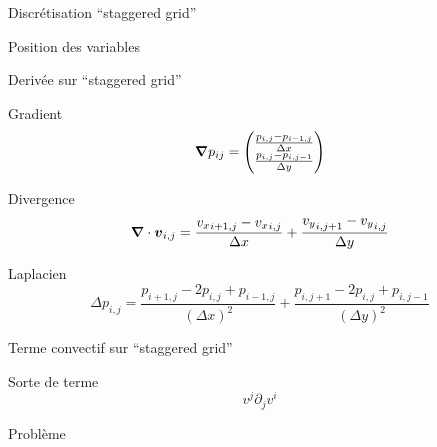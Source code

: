 \begin{frame}{Discrétisation ``staggered grid''}
\begin{block}{Position des variables}
\shorthandoff{;:} 
 \shorthandon{:;}
\end{block}

 
\end{frame}

\begin{frame}{Derivée sur ``staggered grid''}
\begin{block}{Gradient}
 \begin{equation*}
  {\boldsymbol {\nabla}}p_{ij}=\begin{pmatrix}
    \frac{p_{i,j}-p_{i-1,j}}{\Delta x}\\
    \frac{p_{i,j}-p_{i,j-1}}{\Delta y}\\
                      \end{pmatrix}
 \end{equation*}
\end{block}

\begin{block}{Divergence}
 \begin{equation*}
{\boldsymbol {\nabla}}\cdot {\boldsymbol {v}}_{i,j}=\frac{{v_{x}}_{i+1,j}-{v_{x}}_{i,j}}{\Delta x}+\frac{{v_{y}}_{i,j+1}-{v_{y}}_{i,j}}{\Delta y}
 \end{equation*}
\end{block}
 
 \begin{block}{Laplacien}
 \begin{equation*}
    \Delta p_{i,j}=\frac{p_{i+1,j}-2p_{i,j}+p_{i-1,j}}{(\Delta x)^2}+\frac{p_{i,j+1}-2p_{i,j}+p_{i,j-1}}{(\Delta y)^2}
   \end{equation*}
 \end{block}

 
\end{frame}

\begin{frame}{Terme convectif sur ``staggered grid''}
\begin{block}{Sorte de terme}
 \begin{equation*}
v^{j}\partial_{j}v^{i}
\end{equation*}
\end{block}
\begin{block}{Problème}
\end{block}

\end{frame}

